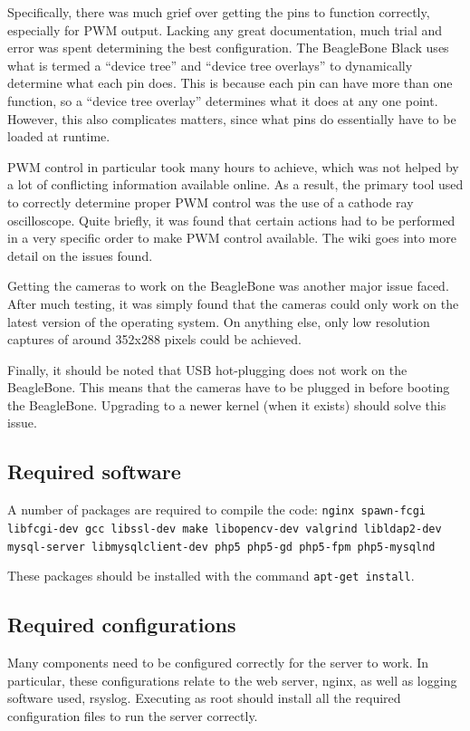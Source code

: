 Specifically, there was much grief over getting the pins to function correctly, especially for PWM output. Lacking any great documentation, much trial and error was spent determining the best configuration. The BeagleBone Black uses what is termed a ``device tree'' \cite{beaglebone3.8, devicetreetutorial} and ``device tree overlays'' to dynamically determine what each pin does. This is because each pin can have more than one function, so a ``device tree overlay'' determines what it does at any one point. However, this also complicates matters, since what pins do essentially have to be loaded at runtime. 

PWM control in particular took many hours to achieve, which was not helped by a lot of conflicting information available online. As a result, the primary tool used to correctly determine proper PWM control was the use of a cathode ray oscilloscope. Quite briefly, it was found that certain actions had to be performed in a very specific order to make PWM control available. The wiki goes into more detail on the issues found.

Getting the cameras to work on the BeagleBone was another major issue faced. After much testing, it was simply found that the cameras could only work on the latest version of the operating system. On anything else, only low resolution captures of around 352x288 pixels could be achieved.

Finally, it should be noted that USB hot-plugging does not work on the BeagleBone. This means that the cameras have to be plugged in before booting the BeagleBone. Upgrading to a newer kernel (when it exists) should solve this issue.


\subsection{Required software}
A number of packages are required to compile the code:
\texttt{nginx spawn-fcgi libfcgi-dev gcc libssl-dev make libopencv-dev valgrind libldap2-dev mysql-server libmysqlclient-dev php5 php5-gd php5-fpm php5-mysqlnd}

These packages should be installed with the command \texttt{apt-get install}.

\subsection{Required configurations}
Many components need to be configured correctly for the server to work. In particular, these configurations relate to the web server, nginx, as well as logging software used, rsyslog. Executing  as root should install all the required configuration files to run the server correctly.

